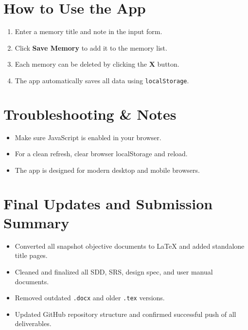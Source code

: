 \documentclass[12pt]{article}
\begin{document}
\section{How to Use the App}
\begin{enumerate}
  \item Enter a memory title and note in the input form.
  \item Click \textbf{Save Memory} to add it to the memory list.
  \item Each memory can be deleted by clicking the \textbf{X} button.
  \item The app automatically saves all data using \texttt{localStorage}.
\end{enumerate}

\section{Troubleshooting \& Notes}
\begin{itemize}
  \item Make sure JavaScript is enabled in your browser.
  \item For a clean refresh, clear browser localStorage and reload.
  \item The app is designed for modern desktop and mobile browsers.
\end{itemize}

\section{Final Updates and Submission Summary}
\begin{itemize}
  \item Converted all snapshot objective documents to LaTeX and added standalone title pages.
  \item Cleaned and finalized all SDD, SRS, design spec, and user manual documents.
  \item Removed outdated \texttt{.docx} and older \texttt{.tex} versions.
  \item Updated GitHub repository structure and confirmed successful push of all deliverables.
\end{itemize}
\end{document}
